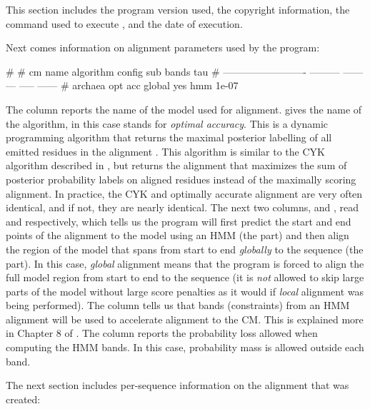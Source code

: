 This section includes the program version used, the copyright
information, the command used to execute , and the date
of execution.

Next comes information on alignment parameters used by the program:

\begin{sreoutput}
#
# cm name                    algorithm  config  sub  bands     tau
# -------------------------  ---------  ------  ---  -----  ------
# archaea                      opt acc  global  yes    hmm   1e-07
\end{sreoutput}

The  column reports the name of the model used for
alignment.  gives the name of the algorithm, in this
case  stands for \emph{optimal accuracy}. This is a
dynamic programming algorithm that returns the maximal posterior
labelling of all emitted residues in the alignment \cite{Holmes98}.
This algorithm is similar to the CYK algorithm described in
\cite{Nawrocki09b}, but returns the alignment that maximizes the sum
of posterior probability labels on aligned residues instead of the
maximally scoring alignment. In practice, the CYK and optimally
accurate alignment are very often identical, and if not, they are
nearly identical.  The next two columns,  and ,
read  and  respectively, which tells us the
program will first predict the start and end points of the alignment
to the model using an HMM (the  part) and then align the
region of the model that spans from start to end \emph{globally} to
the sequence (the  part). In this case, \emph{global}
alignment means that the program is forced to align the full model
region from start to end to the sequence (it is \emph{not}
allowed to skip large parts of the model without large score penalties
as it would if \emph{local} alignment was being performed). The
 column tells us that bands (constraints) from an HMM
alignment will be used to accelerate alignment to the CM. This is
explained more in Chapter 8 of \cite{Nawrocki09b}. The  column
reports the probability loss allowed when computing the HMM bands. In
this case,  probability mass is allowed outside each
band. 

The next section includes per-sequence information on the alignment
that was created:

